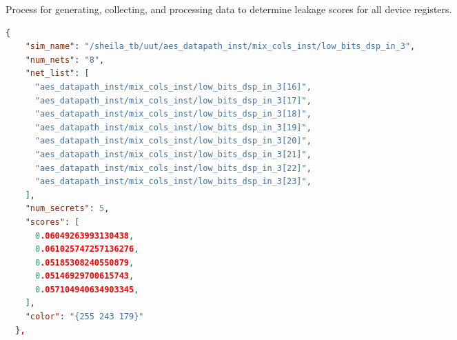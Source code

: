 \begin{singlespacing}
\begin{minipage}[H]{0.83\textwidth}
\begin{algorithm}[H]
  \label{alg:sheila}
  \caption{\small Process for generating, collecting, and processing data to
    determine leakage scores for all device registers.}


\end{algorithm}
\end{minipage}
\end{singlespacing}

\begin{lstlisting}[xleftmargin=0.01\textwidth,
  caption={Sample database entry for one device register, showing all device
    nets that comprise the register and its leakage scores for different secret
    input bits.},
  label=lst:db, float=!ht, language=json]
{
    "sim_name": "/sheila_tb/uut/aes_datapath_inst/mix_cols_inst/low_bits_dsp_in_3",
    "num_nets": "8",
    "net_list": [
      "aes_datapath_inst/mix_cols_inst/low_bits_dsp_in_3[16]",
      "aes_datapath_inst/mix_cols_inst/low_bits_dsp_in_3[17]",
      "aes_datapath_inst/mix_cols_inst/low_bits_dsp_in_3[18]",
      "aes_datapath_inst/mix_cols_inst/low_bits_dsp_in_3[19]",
      "aes_datapath_inst/mix_cols_inst/low_bits_dsp_in_3[20]",
      "aes_datapath_inst/mix_cols_inst/low_bits_dsp_in_3[21]",
      "aes_datapath_inst/mix_cols_inst/low_bits_dsp_in_3[22]",
      "aes_datapath_inst/mix_cols_inst/low_bits_dsp_in_3[23]",
    ],
    "num_secrets": 5,
    "scores": [
      0.06049263993130438,
      0.061025747257136276,
      0.05185308240550879,
      0.05146929700615743,
      0.057104940634903345,
    ],
    "color": "{255 243 179}"
  },
\end{lstlisting}